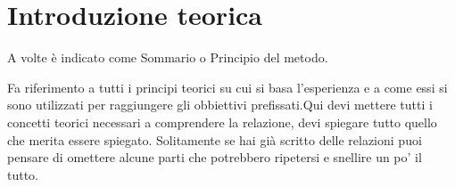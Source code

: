 \section{Introduzione teorica}
A volte è indicato come Sommario o Principio del metodo.

Fa riferimento a tutti i principi teorici su cui si basa l'esperienza e a come essi si sono utilizzati per raggiungere gli obbiettivi prefissati.Qui devi mettere tutti i concetti teorici necessari a comprendere la relazione, devi spiegare tutto quello che merita essere spiegato. Solitamente se hai già scritto delle relazioni puoi pensare di omettere alcune parti che potrebbero ripetersi e snellire un po' il tutto.